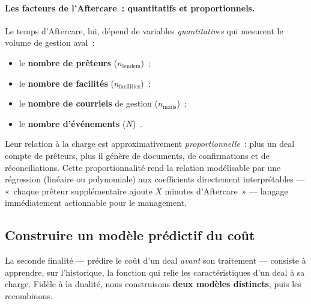 \paragraph{Les facteurs de l'Aftercare~: quantitatifs et proportionnels.}
Le temps d'Aftercare, lui, dépend de variables \emph{quantitatives} qui mesurent le volume de gestion aval~:
\begin{itemize}
    \item le \textbf{nombre de prêteurs} ($n_{\text{lenders}}$)~;
    \item le \textbf{nombre de facilités} ($n_{\text{facilities}}$)~;
    \item le \textbf{nombre de courriels} de gestion ($n_{\text{mails}}$)~;
    \item le \textbf{nombre d'événements} ($N$)~.
\end{itemize}
Leur relation à la charge est approximativement \emph{proportionnelle}~: plus un deal compte de prêteurs, plus il génère de documents, de confirmations et de réconciliations. Cette proportionnalité rend la relation modélisable par une régression (linéaire ou polynomiale) aux coefficients directement interprétables --- «~chaque prêteur supplémentaire ajoute $X$ minutes d'Aftercare~» --- langage immédiatement actionnable pour le management.

\subsection{Construire un modèle prédictif du coût}
\label{sec:modele-predictif}

La seconde finalité --- prédire le coût d'un deal \emph{avant} son traitement --- consiste à apprendre, sur l'historique, la fonction qui relie les caractéristiques d'un deal à sa charge. Fidèle à la dualité, nous construisons \textbf{deux modèles distincts}, puis les recombinons.


